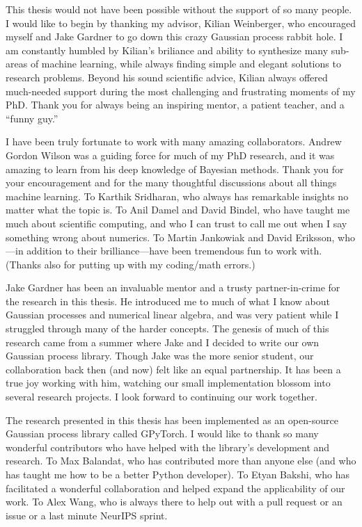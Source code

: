 This thesis would not have been possible without the support of so many people.
I would like to begin by thanking my advisor, Kilian Weinberger, who encouraged myself and Jake Gardner to go down this crazy Gaussian process rabbit hole.
I am constantly humbled by Kilian's briliance and ability to synthesize many sub-areas of machine learning, while always finding simple and elegant solutions to research problems.
Beyond his sound scientific advice, Kilian always offered much-needed support during the most challenging and frustrating moments of my PhD.
Thank you for always being an inspiring mentor, a patient teacher, and a ``funny guy.''

I have been truly fortunate to work with many amazing collaborators.
Andrew Gordon Wilson was a guiding force for much of my PhD research, and it was amazing to learn from his deep knowledge of Bayesian methods.
Thank you for your encouragement and for the many thoughtful discussions about all things machine learning.
To Karthik Sridharan, who always has remarkable insights no matter what the topic is.
To Anil Damel and David Bindel, who have taught me much about scientific computing, and who I can trust to call me out when I say something wrong about numerics.
To Martin Jankowiak and David Eriksson, who---in addition to their brilliance---have been tremendous fun to work with.
(Thanks also for putting up with my coding/math errors.)

Jake Gardner has been an invaluable mentor and a trusty partner-in-crime for the research in this thesis.
He introduced me to much of what I know about Gaussian processes and numerical linear algebra, and was very patient while I struggled through many of the harder concepts.
The genesis of much of this research came from a summer where Jake and I decided to write our own Gaussian process library.
Though Jake was the more senior student, our collaboration back then (and now) felt like an equal partnership.
It has been a true joy working with him, watching our small implementation blossom into several research projects.
I look forward to continuing our work together.

The research presented in this thesis has been implemented as an open-source Gaussian process library called GPyTorch.
I would like to thank so many wonderful contributors who have helped with the library's development and research.
To Max Balandat, who has contributed more than anyone else (and who has taught me how to be a better Python developer).
To Etyan Bakshi, who has facilitated a wonderful collaboration and helped expand the applicability of our work.
To Alex Wang, who is always there to help out with a pull request or an issue or a last minute NeurIPS sprint.

